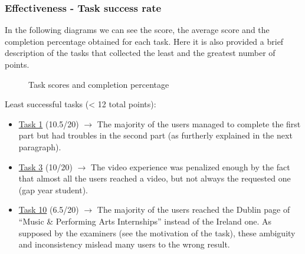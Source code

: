 \documentclass[11pt, letterpaper]{article}
\begin{document}
\subsubsection{Effectiveness - Task success rate}
In the following diagrams we can see the score, the average score and the completion percentage obtained for each task. Here it is also provided a brief description of the tasks that collected the least and the greatest number of points. \\
\begin{figure}[H]
    \centering
    \caption{Task scores and completion percentage}
    \label{fig:scores_per_task}
\end{figure}
\noindent
Least successful tasks (< 12 total points): 
\begin{itemize}
    \item \hyperref[Task:01]{Task 1} (10.5/20) $\rightarrow$ The majority of the users managed to complete the first part but had troubles in the second part (as furtherly explained in the next paragraph). 
    \item \hyperref[Task:03]{Task 3} (10/20) $\rightarrow$ The video experience was penalized enough by the fact that almost all the users reached a video, but not always the requested one (gap year student).
    \item \hyperref[Task:10]{Task 10} (6.5/20) $\rightarrow$ The majority of the users reached the Dublin page of “Music \& Performing Arts Internships” instead of the Ireland one. As supposed by the examiners (see the motivation of the task), these ambiguity and inconsistency mislead many users to the wrong result. 
\end{itemize}
\end{document}

